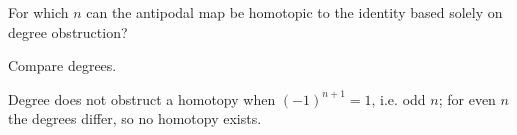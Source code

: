 \begin{exercise}\label{exr:viii04-ped-16}
For which $n$ can the antipodal map be homotopic to the identity based solely on degree obstruction?
\end{exercise}
\begin{hint}
Compare degrees.
\end{hint}
\begin{solution}
Degree does not obstruct a homotopy when $(-1)^{n+1}=1$, i.e. odd $n$; for even $n$ the degrees differ, so no homotopy exists.
\end{solution}

